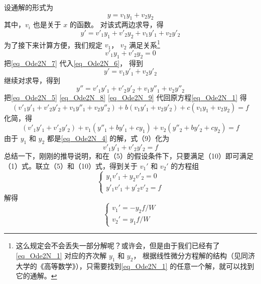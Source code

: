 设通解的形式为
\begin{equation}\label{eq_Ode2N_5}
y = v_1 y_1 + v_2 y_2
\end{equation}
其中，$v_i$ 也是关于 $x$ 的函数。 对该式两边求导，得
\begin{equation}\label{eq_Ode2N_6}
y' = v'_1 y_1 + v'_2 y_2 + v_1 y'_1 + v_2 y'_2
\end{equation}
为了接下来计算方便，我们规定 $v_1$， $v_2$ 满足关系\footnote{这么规定会不会丢失一部分解呢？或许会，但是由于我们已经有了\autoref{eq_Ode2N_1} 对应的齐次解 $y_1$ 和 $y_2$， 根据线性微分方程解的结构（见同济大学的《高等数学》），只需要找到\autoref{eq_Ode2N_1} 的任意一个解，就可以找到它的通解。}
\begin{equation}\label{eq_Ode2N_7}
v'_1 y_1 + v'_2 y_2 = 0
\end{equation}
把\autoref{eq_Ode2N_7} 代入\autoref{eq_Ode2N_6}， 得到
\begin{equation}\label{eq_Ode2N_8}
y' = v_1 y'_1 + v_2 y'_2
\end{equation}
继续对求导，得到
\begin{equation}\label{eq_Ode2N_9}
y'' = v'_1 y'_1 + v'_2 y'_2 + v_1 y''_1 + v_2 y''_2
\end{equation}
把\autoref{eq_Ode2N_5} \autoref{eq_Ode2N_8} \autoref{eq_Ode2N_9} 代回原方程\autoref{eq_Ode2N_1} 得
\begin{equation}
(v'_1 y'_1 + v'_2 y'_2 + v_1 y''_1 + v_2 y''_2) + b (v_1 y'_1 + v_2 y'_2) + c(v_1 y_1 + v_2 y_2) = f
\end{equation}
化简，得
\begin{equation}
(v'_1 y'_1 + v'_2 y'_2) + v_1 ( y''_1 + b y'_1 + c y_1) + v_2 ( y''_2 + b y'_2 + c y_2) = f \end{equation}
由于 $y_1$ 和 $y_2$ 都是\autoref{eq_Ode2N_4} 的解，式（9）化为 %
\begin{equation} v'_1 y'_1 + v'_2 y'_2 = f
\end{equation}
总结一下，刚刚的推导说明，和在（5）的假设条件下，只要满足（10）即可满足（1）式。联立（5）和（10）式，得到关于 $v_1'$ 和 $v_2'$ 的方程组
\begin{equation}
\begin{cases}
y_1 v'_1 + y_2 v'_2 = 0\\
y'_1 v'_1 + y'_2 v'_2 = f
\end{cases}
\end{equation}
解得
\begin{equation}
\begin{cases}
v_1' = -y_2f/W\\
v_2' = y_1 f/W
\end{cases}
\end{equation}
